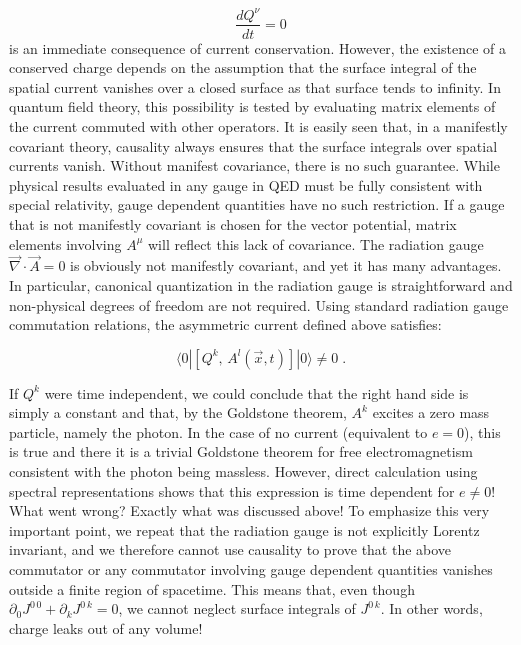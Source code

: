 \documentclass[12pt]{article}
\newcommand{\pa}{\partial}
\newcommand{\ipop}[3]{\ensuremath{\langle#1 | #2 | #3\rangle}\xspace}
\begin{document}
      \begin{equation*} \frac{dQ^{\nu}}{dt} = 0 \end{equation*} is an
      immediate consequence of current conservation. However, the existence of
      a conserved charge depends on the assumption that the surface integral
      of the spatial current vanishes over a closed surface as that surface
      tends to infinity. In quantum field theory, this possibility is tested
      by evaluating matrix elements of the current commuted with other
      operators. It is easily seen that, in a manifestly covariant theory,
      causality always ensures that the surface integrals over spatial
      currents vanish. Without manifest covariance, there is no such
      guarantee. While physical results evaluated in any gauge in QED must be
      fully consistent with special relativity, gauge dependent quantities
      have no such restriction. If a gauge that is not manifestly covariant is
      chosen for the vector potential, matrix elements involving $A^{\mu}$
      will reflect this lack of covariance.  The radiation gauge
      $\vec\nabla\cdot\vec{A} = 0$ is obviously not manifestly covariant, and
      yet it has many advantages. In particular, canonical quantization in the
      radiation gauge is straightforward and non-physical degrees of freedom
      are not required. Using standard radiation gauge commutation relations,
      the asymmetric current defined above satisfies:

    \begin{equation*}
      \ipop{0}{ [Q^{k} ,\, A^{l}(\vec{x}, t)] }{0} \neq 0\; .
    \end{equation*}

    If $Q^{k}$ were time independent, we could conclude that the right
    hand side is simply a constant and that, by the Goldstone theorem,
    $A^{k}$ excites a zero mass particle, namely the photon. In the
    case of no current (equivalent to $e=0$), this is true and there
    it is a trivial Goldstone theorem for free electromagnetism
    consistent with the photon being massless.  However, direct
    calculation using spectral representations shows that this
    expression is time dependent for $e \neq 0$! What went wrong?
    Exactly what was discussed above! To emphasize this very important
    point, we repeat that the radiation gauge is not explicitly
    Lorentz invariant, and we therefore cannot use causality to prove
    that the above commutator or any commutator involving gauge
    dependent quantities vanishes outside a finite region of
    spacetime.  This means that, even though $\pa_{0} J^{0\, 0} +
    \pa_{k} J^{0\, k} = 0$, we cannot neglect surface integrals of
    $J^{0\, k}$. In other words, charge leaks out of any volume!
\end{document}
